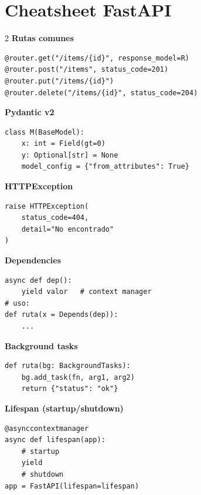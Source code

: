 \documentclass[11pt,a4paper]{article}
\begin{document}
\section{Cheatsheet FastAPI}

\begin{multicols}{2}
\textbf{\textcolor{fapigreen}{Rutas comunes}}
\begin{lstlisting}[style=python,numbers=none]
@router.get("/items/{id}", response_model=R)
@router.post("/items", status_code=201)
@router.put("/items/{id}")
@router.delete("/items/{id}", status_code=204)
\end{lstlisting}

\textbf{\textcolor{fapigreen}{Pydantic v2}}
\begin{lstlisting}[style=python,numbers=none]
class M(BaseModel):
    x: int = Field(gt=0)
    y: Optional[str] = None
    model_config = {"from_attributes": True}
\end{lstlisting}

\textbf{\textcolor{fapigreen}{HTTPException}}
\begin{lstlisting}[style=python,numbers=none]
raise HTTPException(
    status_code=404,
    detail="No encontrado"
)
\end{lstlisting}

\columnbreak

\textbf{\textcolor{fapigreen}{Dependencies}}
\begin{lstlisting}[style=python,numbers=none]
async def dep():
    yield valor   # context manager
# uso:
def ruta(x = Depends(dep)):
    ...
\end{lstlisting}

\textbf{\textcolor{fapigreen}{Background tasks}}
\begin{lstlisting}[style=python,numbers=none]
def ruta(bg: BackgroundTasks):
    bg.add_task(fn, arg1, arg2)
    return {"status": "ok"}
\end{lstlisting}

\textbf{\textcolor{fapigreen}{Lifespan (startup/shutdown)}}
\begin{lstlisting}[style=python,numbers=none]
@asynccontextmanager
async def lifespan(app):
    # startup
    yield
    # shutdown
app = FastAPI(lifespan=lifespan)
\end{lstlisting}
\end{multicols}
\end{document}
